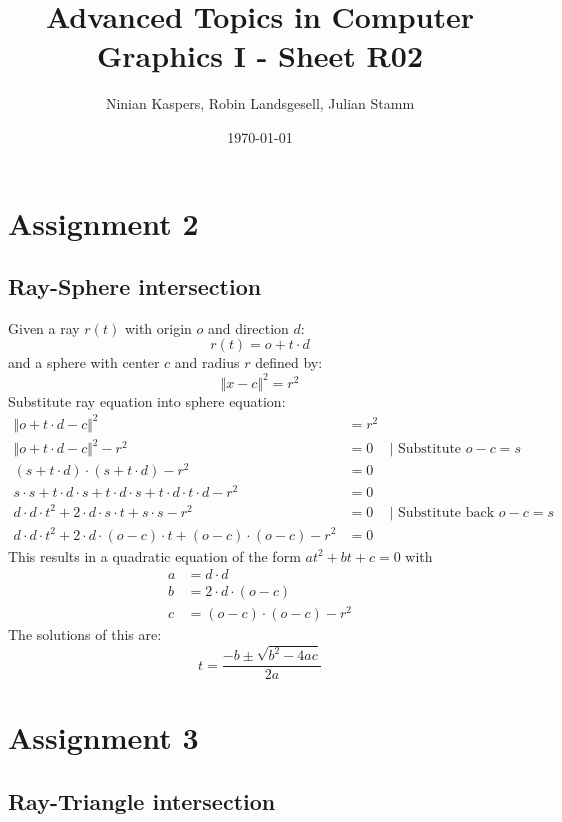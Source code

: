 \documentclass{article}
\title{Advanced Topics in Computer Graphics I - Sheet R02}
\author{Ninian Kaspers, Robin Landsgesell, Julian Stamm}
\date{\today}
\begin{document}
\maketitle

\section*{Assignment 2}

\subsection*{Ray-Sphere intersection}

Given a ray $r(t)$ with origin $o$ and direction $d$:
\begin{equation*}
  r(t) = o + t \cdot d  
\end{equation*}
and a sphere with center $c$ and radius $r$ defined by:
\begin{equation*}
  \Vert x - c \Vert^2 = r^2
\end{equation*}
Substitute ray equation into sphere equation:
\begin{align*}
  \Vert o + t \cdot d - c \Vert^2 &= r^2\\
  \Vert o + t \cdot d - c \Vert^2 - r^2 &= 0 &\vert\text{ Substitute }o-c=s\\
  (s + t \cdot d) \cdot (s + t \cdot d) - r^2 &= 0\\
  s \cdot s + t \cdot d \cdot s + t \cdot d \cdot s + t \cdot d \cdot t \cdot d - r^2 &= 0\\
  d \cdot d \cdot t^2 + 2 \cdot d \cdot s \cdot t + s \cdot s - r^2 &= 0 &\vert\text{ Substitute back }o-c=s\\
  d \cdot d \cdot t^2 + 2 \cdot d \cdot (o-c) \cdot t + (o-c) \cdot (o-c) - r^2 &= 0
\end{align*}
This results in a quadratic equation of the form $at^2 + bt + c = 0$ with
\begin{align*}
  a &= d \cdot d\\
  b &= 2 \cdot d \cdot (o-c)\\
  c &= (o-c) \cdot (o-c) - r^2
\end{align*}
The solutions of this are:
\begin{equation*}
  t = \frac{-b \pm \sqrt{b^2 - 4ac}}{2a}
\end{equation*}

\section*{Assignment 3}

\subsection*{Ray-Triangle intersection}

\end{document}
